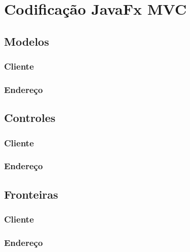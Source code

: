 \section{Codificação JavaFx MVC}


\subsection{Modelos}

\subsubsection{Cliente}

\subsubsection{Endereço}



\subsection{Controles}

\subsubsection{Cliente}

\subsubsection{Endereço}



\subsection{Fronteiras}

\subsubsection{Cliente}

\subsubsection{Endereço}
